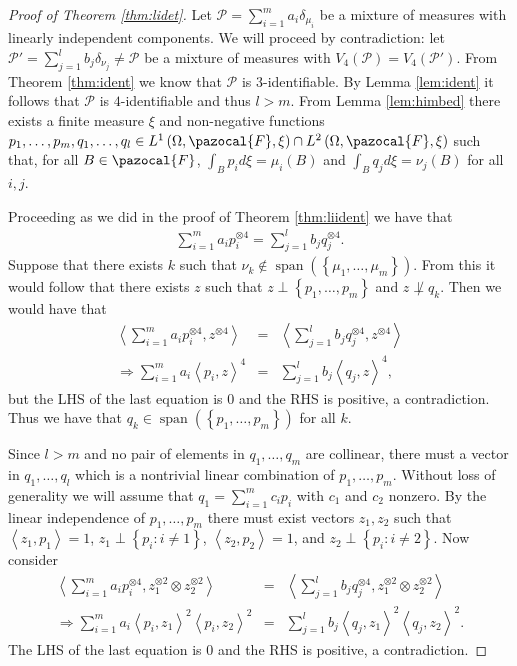 \documentclass[aos,preprint]{imsart}
\def\l{\left}
\def\r{\right}
\def\sF{\pazocal{F}}
\def\sP{\mathscr{P}}
\def\spn{\operatorname{span}}
\theoremstyle{plain}
\theoremstyle{defintion}
\begin{document}
	\begin{proof}[Proof of Theorem \ref{thm:lidet}]
		Let $\sP = \sum_{i=1}^m a_i \delta_{\mu_i}$ be a mixture of measures with linearly independent components. We will proceed by contradiction:  let $\sP' = \sum_{j=1}^l  b_j \delta_{\nu_j} \neq \sP$ be a mixture of measures with $V_4(\sP) = V_4(\sP')$. From Theorem \ref{thm:ident} we know that $\sP$ is $3$-identifiable. By Lemma \ref{lem:ident} it follows that $\sP$ is $4$-identifiable and thus $l>m$. From Lemma \ref{lem:himbed} there exists a finite measure $\xi$ and non-negative functions $p_1,\ldots,p_m,q_1,\ldots,q_l \in L^1\left( \Omega, \sF, \xi \right)\cap L^2\left( \Omega, \sF, \xi \right)$ such that, for all $B\in \sF$, $\int_B p_i d\xi = \mu_i(B)$ and $\int_B q_j d\xi = \nu_j\left( B \right)$ for all $i,j$.

		Proceeding as we did in the proof of Theorem \ref{thm:liident} we have that
		\begin{eqnarray*}
			\sum_{i=1}^m a_i p_i^{\otimes 4} = \sum_{j=1}^{l} b_j q_j^{\otimes 4}.
		\end{eqnarray*}
		Suppose that there exists $k$ such that $\nu_k \notin \spn\left( \left\{ \mu_1,\ldots,\mu_m \right\} \right)$. From this it would follow that there exists $z$ such that $z\perp \left\{ p_1,\ldots,p_m \right\}$ and $z \not \perp q_k$. Then we would have that 
		\begin{eqnarray*}
			\l<\sum_{i=1}^m a_i p_i^{\otimes 4},z^{\otimes 4}\r> &=& \l< \sum_{j=1}^{l} b_j q_j^{\otimes 4}, z^{\otimes 4}\r>\\
			\Rightarrow \sum_{i=1}^m a_i \l<p_i,z\r>^4 &=&  \sum_{j=1}^l b_j \l<q_j,z\r>^4,
		\end{eqnarray*}
		but the LHS of the last equation is 0 and the RHS is positive, a contradiction. Thus we have that $q_k \in \spn\left( \left\{ p_1,\ldots,p_m \right\} \right)$ for all $k$.

		Since $l>m$ and no pair of elements in $q_1,\ldots,q_m$ are collinear, there must a vector in $q_1,\ldots, q_l$ which is a nontrivial linear combination of $p_1,\ldots,p_m$. Without loss of generality we will assume that $q_1 = \sum_{i=1}^m c_i p_i$ with $c_1$ and $c_2$ nonzero. By the linear independence of $p_1,\ldots,p_m$ there must exist vectors $z_1,z_2$ such that $\l<z_1, p_1\r> =1$, $z_1 \perp \left\{ p_i : i\neq 1\right\}$, $\l<z_2,p_2\r> = 1$, and $z_2 \perp \left\{ p_i: i\neq 2 \right\}$. Now consider
		\begin{eqnarray*}
			\l<\sum_{i=1}^m a_i p_i^{\otimes 4},z_1^{\otimes 2} \otimes z_2^{\otimes 2}\r> &=& \l< \sum_{j=1}^{l} b_j q_j^{\otimes 4}, z_1^{\otimes 2} \otimes z_2^{\otimes 2}\r>\\
			\Rightarrow\sum_{i=1}^m a_i \l< p_i,z_1\r>^2 \l<p_i, z_2\r>^2 &=&\sum_{j=1}^{l} b_j\l<   q_j, z_1\r>^2 \l< q_j, z_2\r>^2.
		\end{eqnarray*}
		The LHS of the last equation is 0 and the RHS is positive, a contradiction.
	\end{proof}
\end{document}
